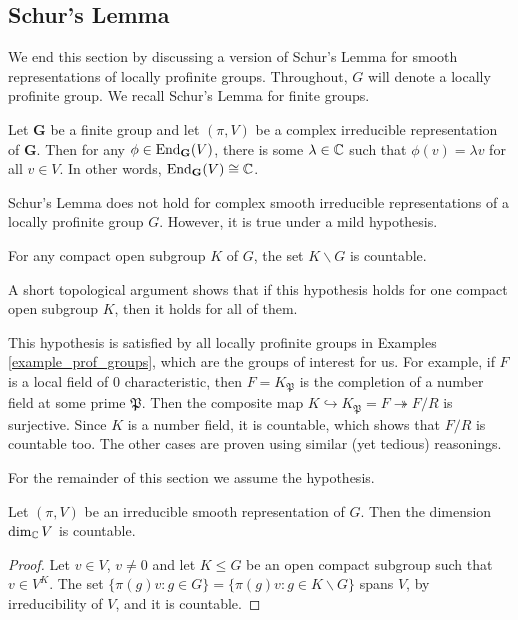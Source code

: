 \subsection{Schur's Lemma}

We end this section by discussing a version of Schur's Lemma for smooth representations of locally profinite groups. Throughout, $G$ will denote a locally profinite group. We recall Schur's Lemma for finite groups.

\begin{thm}
    Let $\mathbf{G}$ be a finite group and let $(\pi,V)$ be a complex irreducible representation of $\mathbf G$. Then for any $\phi\in\mathrm{End}_{\mathbf{G}}(V)$, there is some $\lambda\in\mathbb{C}$ such that $\phi(v)=\lambda v$ for all $v\in V$. In other words, $\mathrm{End}_{\mathbf{G}}(V)\cong\mathbb{C}$.
\end{thm}

Schur's Lemma does not hold for complex smooth irreducible representations of a locally profinite group $G$. However, it is true under a mild hypothesis.

\begin{hypothesis}
    For any compact open subgroup $K$ of $G$, the set $K\backslash G$ is countable.
\end{hypothesis}

A short topological argument shows that if this hypothesis holds for one compact open subgroup $K$, then it holds for all of them.

\begin{example}
    This hypothesis is satisfied by all locally profinite groups in Examples \ref{example_prof_groups}, which are the groups of interest for us. For example, if $F$ is a local field of $0$ characteristic, then $F=K_\mathfrak{P}$ is the completion of a number field at some prime $\mathfrak{P}$. Then the composite map $K\hookrightarrow K_\mathfrak{P}=F\twoheadrightarrow F/R$ is surjective. Since $K$ is a number field, it is countable, which shows that $F/R$ is countable too. The other cases are proven using similar (yet tedious) reasonings.
\end{example}

 For the remainder of this section we assume the hypothesis.


\begin{lemma}
    Let $(\pi,V)$ be an irreducible smooth representation of $G$. Then the dimension $\dim_{\mathbb{C}}V$ is countable.
\end{lemma}
\begin{proof}
    Let $v\in V$, $v\neq0$ and let $K \leq G$ be an open compact subgroup such that $v\in V^K$. The set $\{\pi(g)v:g\in G\}=\{\pi(g)v:g\in K\backslash G\}$ spans $V$, by irreducibility of $V$, and it is countable.
\end{proof}

